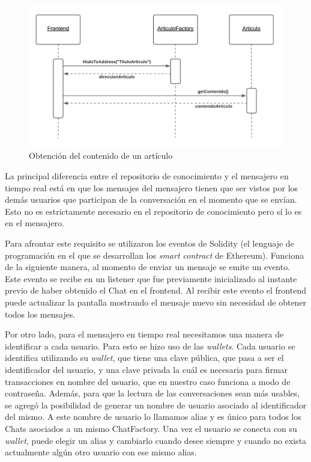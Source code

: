 \begin{figure}[H]
    \centering
    \includegraphics[width=0.75\linewidth]{img/ds-aw-eth-obtener-contenido-articulo.png}
    \caption{Obtención del contenido de un artículo}
    \label{fig:ds-aw-eth-obtener-contenido-articulo}
\end{figure}

La principal diferencia entre el repositorio de conocimiento y el mensajero en tiempo real está en que los mensajes del mensajero tienen que ser vistos por los demás usuarios que participan de la conversación en el momento que se envían. Esto no es estrictamente necesario en el repositorio de conocimiento pero sí lo es en el mensajero.

Para afrontar este requisito se utilizaron los eventos de Solidity (el lenguaje de programación en el que se desarrollan los \textit{smart contract} de Ethereum). Funciona de la siguiente manera, al momento de enviar un mensaje se emite un evento. Este evento se recibe en un listener que fue previamente inicializado al instante previo de haber obtenido el Chat en el frontend. Al recibir este evento el frontend puede actualizar la pantalla mostrando el mensaje nuevo sin necesidad de obtener todos los mensajes.


Por otro lado, para el mensajero en tiempo real necesitamos una manera de identificar a cada usuario. Para esto se hizo uso de las \textit{wallets}. Cada usuario se identifica utilizando su \textit{wallet}, que tiene una clave pública, que pasa a ser el identificador del usuario, y una clave privada la cuál es necesaria para firmar transacciones en nombre del usuario, que en nuestro caso funciona a modo de contraseña. Además, para que la lectura de las conversaciones sean más usables, se agregó la posibilidad de generar un nombre de usuario asociado al identificador del mismo. A este nombre de usuario lo llamamos alias y es único para todos los Chats asociados a un mismo ChatFactory. Una vez el usuario se conecta con su \textit{wallet}, puede elegir un alias y cambiarlo cuando desee siempre y cuando no exista actualmente algún otro usuario con ese mismo alias.


